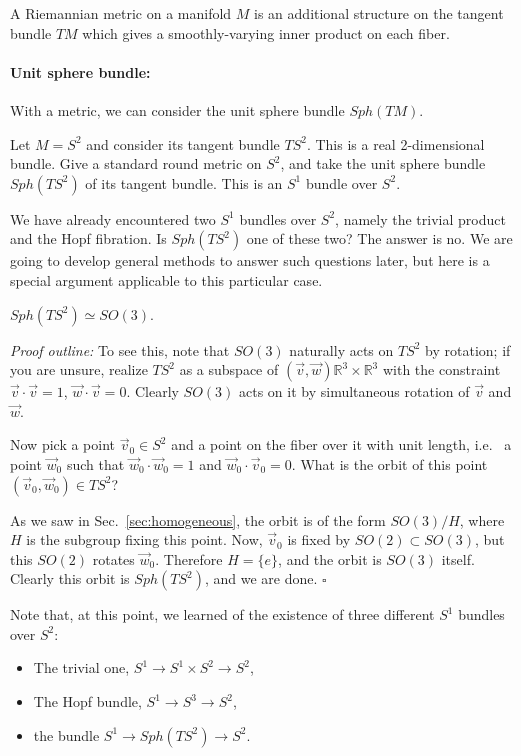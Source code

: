 \documentclass[12pt]{article}
\numberwithin{equation}{section}
\numberwithin{figure}{section}
\theoremstyle{remark}
\renewenvironment{proof}{\noindent\textsl{Proof outline:}}{\hfill$\square$}
\def\bR{\mathbb{R}}
\begin{document}
\begin{definition}
A Riemannian metric on a manifold $M$
is an additional structure on the tangent bundle $TM$
which gives a smoothly-varying inner product 
on each fiber.
\end{definition}

\paragraph{Unit sphere bundle:}
With a metric, we can consider the unit sphere bundle $Sph(TM)$.

\begin{example}
Let $M=S^2$ and consider its tangent bundle $TS^2$.
This is a real 2-dimensional bundle.
Give a standard round metric on $S^2$,
and take the unit sphere bundle $Sph(TS^2)$ of its tangent bundle.
This is an $S^1$ bundle over $S^2$.
\end{example}
We have already encountered two $S^1$ bundles over $S^2$,
namely the trivial product and the Hopf fibration.
Is $Sph(TS^2)$ one of these two?
The answer is no.
We are going to develop general methods to answer such questions later,
but here is a special argument applicable to this particular case.
\begin{example}
$Sph(TS^2) \simeq SO(3)$.
\end{example}

\begin{proof}
To see this, note that $SO(3)$ naturally acts on $TS^2$ by rotation;
if you are unsure, realize $TS^2$ as a subspace of $(\vec v,\vec w) \bR^3\times \bR^3$
with the constraint $\vec v\cdot \vec v=1$, $\vec w\cdot \vec v=0$.
Clearly $SO(3)$ acts on it by simultaneous rotation of $\vec v$ and $\vec w$.

Now pick a point $\vec v_0 \in S^2$ and a point on the fiber over it with unit length, 
i.e.~ a point $\vec w_0$ such that $\vec w_0\cdot \vec w_0=1$ and $\vec w_0\cdot \vec v_0 =0$.
What is the orbit of this point $(\vec v_0,\vec w_0)\in TS^2$?

As we saw in Sec.~\ref{sec:homogeneous}, the orbit is of the form $SO(3)/H$, where $H$ is the subgroup fixing this point.
Now, $\vec v_0$ is fixed by $SO(2)\subset SO(3)$, but this $SO(2)$ rotates $\vec w_0$.
Therefore $H=\{e\}$, and the orbit is $SO(3)$ itself.
Clearly this orbit is $Sph(TS^2)$, and we are done.
\end{proof}

Note that, at this point, we learned of the existence of three different $S^1$ bundles over $S^2$:
\begin{itemize}
\item The trivial one, $S^1\to S^1\times S^2\to S^2$,
\item The Hopf bundle, $S^1\to S^3\to S^2$,
\item the bundle $S^1\to Sph(TS^2)\to S^2$.
\end{itemize}
\end{document}
